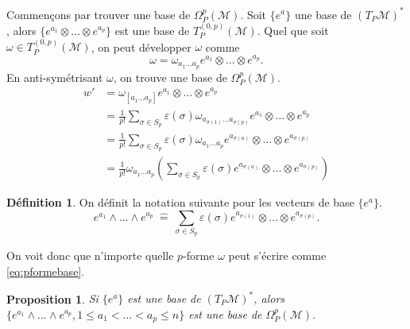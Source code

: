 \documentclass[a4paper,11pt]{report}
\theoremstyle{definition}
\theoremstyle{plain}
\newtheorem{prop}[thm]{Proposition}
\theoremstyle{definition}
\newtheorem{defn}{Définition}[chapter]
\theoremstyle{remark}
\newcommand{\M}{\mathscr{M}}
\begin{document}
            Commençons par trouver une base de $\Omega_P^p(\M)$. Soit $\{e^a\}$ une base de $(T_P\M)^*$, alors $\{e^{a_1}\otimes\dots \otimes e^{a_p}\}$ est une base de $T_P^{(0,p)}(\M)$. Quel que soit $\omega\in T_P^{(0,p)}(\M)$, on peut développer $\omega$ comme
            \begin{equation}
                \omega = \omega_{a_1\dots a_p} e^{a_1}\otimes\dots\otimes e^{a_p}.
            \end{equation}
            En anti-symétrisant $\omega$, on trouve une base de $\Omega_P^p(\M)$.
            \begin{align}\label{dev:pformebase}
                w' &= \omega_{[a_1\dots a_p]} e^{a_1}\otimes\dots\otimes e^{a_p}\\
                &= \frac{1}{p!} \sum_{\sigma\in S_p}\varepsilon(\sigma) \omega_{a_{\sigma(1)}\dots a_{\sigma(p)}} e^{a_1}\otimes\dots\otimes e^{a_p}\\
                &= \frac{1}{p!} \sum_{\sigma\in S_p}\varepsilon(\sigma) \omega_{a_1\dots a_p} e^{a_{\sigma(a)}}\otimes\dots\otimes e^{a_{\sigma(p)}}\\
                &= \frac{1}{p!}\omega_{a_1\dots a_p} \left( \sum_{\sigma\in S_p}\varepsilon(\sigma)  e^{a_{\sigma(a)}}\otimes\dots\otimes e^{a_{\sigma(p)}}\right)\label{eq:pformebase}
            \end{align}
            
            \begin{defn}
                On définit la notation suivante pour les vecteurs de base $\{e^a\}$.
                \begin{equation}
                    e^{a_1}\wedge \dots\wedge e^{a_{p}} ~\hat{=}~ \sum_{\sigma\in S_p}\varepsilon(\sigma)e^{a_{\sigma(1)}}\otimes\dots\otimes e^{a_{\sigma(p)}}.
                \end{equation}
            \end{defn}
            
            On voit donc que n'importe quelle $p$-forme $\omega$ peut s'écrire comme \ref{eq:pformebase}.
            \begin{prop}
                Si $\{e^a\}$ est une base de $(T_P\M)^*$, alors $\{e^{a_1}\wedge\dots \wedge e^{a_p},1\leq a_1<\dots<a_p\leq n\}$ est une base de $\Omega_P^p(\M)$.
            \end{prop}
            
\end{document}

